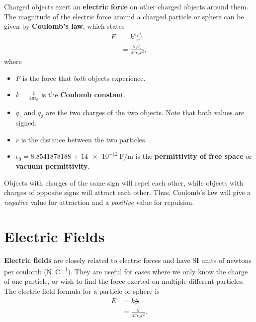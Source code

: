 Charged objects exert an \textbf{electric force} on other charged
objects around them.
The magnitude of the electric force around a charged particle or
sphere can be given by \textbf{Coulomb's law},
which states
\begin{equation} \label{eq:coulombs-law}
    \begin{aligned}
        F &= k \frac{q_1 q_2}{r^2} \\
        &= \frac{q_1 q_2}{4 \pi \epsilon_0 r^2},
    \end{aligned}
\end{equation}
where
\begin{itemize}
    \item \(F\) is the force that \emph{both} objects experience.
    \item \(k = \frac{1}{4 \pi \epsilon_0}\) is the \textbf{Coulomb constant}.
    \item \(q_1\) and \(q_2\) are the two charges of the two objects.
        Note that both values are signed.
    \item \(r\) is the distance between the two particles.
    \item \(\epsilon_0 = \qty{8.854 187 8188(14)e-12}{\farad \per \metre}\)
        is the \textbf{permittivity of free space}
        or \textbf{vacuum permittivity}. \autocite{nist-epsilon_0}
\end{itemize}
Objects with charges of the same sign will repel each other,
while objects with charges of opposite signs will attract each other.
Thus, Coulomb's law will give a \emph{negative} value for attraction
and a \emph{positive} value for repulsion.

\section{Electric Fields}

\textbf{Electric fields} are closely related to electric forces
and have SI units of newtons per coulomb (\unit{\newton \per \coulomb}).
They are useful for cases where we only know the charge of one particle,
or wish to find the force exerted on multiple different particles.
The electric field formula for a particle or sphere is
\begin{equation} \label{eq:sphere-electric-field}
    \begin{aligned}
        E &= k \frac{q}{r^2} \\
        &= \frac{q}{4 \pi \epsilon_0 r^2}.
    \end{aligned}
\end{equation}

